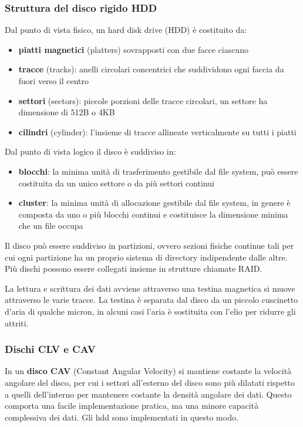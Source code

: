 \documentclass[a4paper]{article}
\begin{document}
\subsubsection*{Struttura del disco rigido HDD}
Dal punto di vista fisico, un hard disk drive (HDD) è costituito da:
\begin{itemize}
	\item \textbf{piatti magnetici} (platters) sovrapposti con due facce ciascuno
	\item \textbf{tracce} (tracks): anelli circolari concentrici che suddividono ogni faccia da fuori verso il centro
	\item \textbf{settori} (sectors): piccole porzioni delle tracce circolari, un settore ha dimensione di 512B o 4KB
	\item \textbf{cilindri} (cylinder): l’insieme di tracce allineate verticalmente su tutti i piatti
\end{itemize}

Dal punto di vista logico il disco è suddiviso in:
\begin{itemize}
	\item \textbf{blocchi}: la minima unità di trasferimento gestibile dal file system, può essere costituita da un unico settore o da più
	settori continui
	\item \textbf{cluster}: la minima unità di allocazione gestibile dal file system, in genere è composta da uno o più blocchi continui
	e costituisce la dimensione minima che un file occupa
\end{itemize}

Il disco può essere suddiviso in partizioni, ovvero sezioni fisiche continue tali per cui ogni partizione ha un proprio sistema
di directory indipendente dalle altre. Più dischi possono essere collegati insieme in strutture chiamate RAID.

La lettura e scrittura dei dati avviene attraverso una testina magnetica si muove attraverso le varie tracce. La testina è separata
dal disco da un piccolo cuscinetto d'aria di qualche micron, in alcuni casi l'aria è sostituita con l'elio per ridurre gli attriti.

\subsubsection*{Dischi CLV e CAV}
In un \textbf{disco CAV} (Constant Angular Velocity) si mantiene costante la velocità angolare del disco, per cui i settori all'esterno
del disco sono più dilatati rispetto a quelli dell'interno per mantenere costante la densità angolare dei dati. Questo comporta
una facile implementazione pratica, ma una minore capacità complessiva dei dati. Gli hdd sono implementati in questo modo.
\end{document}

